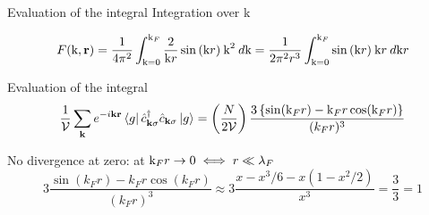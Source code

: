 \begin{frame}[t]{Evaluation of the integral}
  \vspace{0.3cm}
  Integration over k

  \begin{equation*}
    F(\text{k}, \textbf{r}) =
    \frac{1}{4 \pi^2} \int_{\text{k} = 0}^{\text{k}_F}
    \frac{2}{\text{k}r}\sin{(\text{k}r)} \: \text{k}^2 \: d \text{k} =
    \frac{1}{2 \pi^2 r^3} \int_{\text{k} = 0}^{\text{k}_F}
    \sin{(\text{k}r)} \: \text{k} r \: d \text{k}r
  \end{equation*}


\end{frame}

\begin{frame}{Evaluation of the integral}
  \begin{equation*}
    \frac{1}{\mathcal{V}} \sum_{\textbf{k}} e^{- i \textbf{k}\textbf{r}}
    \bra{g} \hat c^{\dagger}_{\textbf{k}\sigma} \hat c_{\textbf{k}\sigma} \ket{g} =
    \left ( \frac{N}{2\mathcal{V}} \right )
    \frac{3 \left \{ \sin(\text{k}_F r) - \text{k}_F r \cos(\text{k}_F r) \right \} }{(k_F r)^3}
  \end{equation*}

  \vspace{1cm}
  No divergence at zero: at $\text{k}_F r \to 0 \iff r \ll \lambda_F$
  \begin{equation*}
    3 \frac{\sin(k_F r) - k_F r \cos(k_F r)}{(k_F r)^3} \approx
    3 \frac{x - x^3/6 - x (1 - x^2/2)}{x^3} = \frac{3}{3} = 1
  \end{equation*}
\end{frame}
